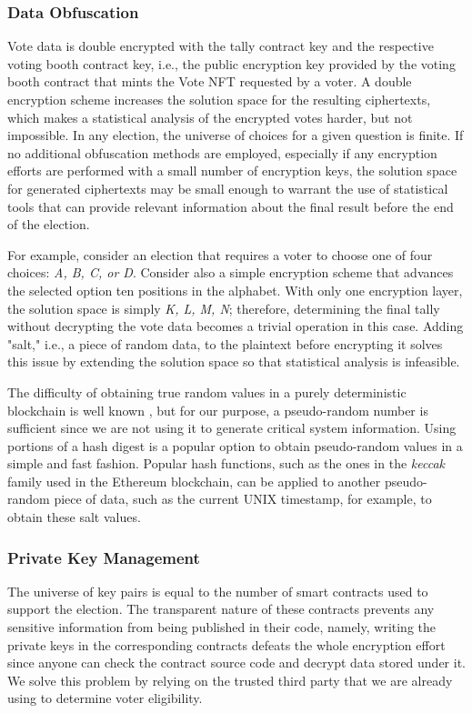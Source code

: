 \documentclass[../main.tex]{subfiles}
\begin{document}
\subsubsection{Data Obfuscation}
Vote data is double encrypted with the tally contract key and the respective voting booth contract key, i.e., the public encryption key provided by the voting booth contract that mints the Vote NFT requested by a voter. A double encryption scheme increases the solution space for the resulting ciphertexts, which makes a statistical analysis of the encrypted votes harder, but not impossible. In any election, the universe of choices for a given question is finite. If no additional obfuscation methods are employed, especially if any encryption efforts are performed with a small number of encryption keys, the solution space for generated ciphertexts may be small enough to warrant the use of statistical tools that can provide relevant information about the final result before the end of the election.
\par
For example, consider an election that requires a voter to choose one of four choices: \textit{A, B, C, or D}. Consider also a simple encryption scheme that advances the selected option ten positions in the alphabet. With only one encryption layer, the solution space is simply \textit{K, L, M, N}; therefore, determining the final tally without decrypting the vote data becomes a trivial operation in this case. Adding "salt," i.e., a piece of random data, to the plaintext before encrypting it solves this issue by extending the solution space so that statistical analysis is infeasible.
\par
The difficulty of obtaining true random values in a purely deterministic blockchain is well known \cite{Antonopoulos2018}, but for our purpose, a pseudo-random number is sufficient since we are not using it to generate critical system information. Using portions of a hash digest is a popular option to obtain pseudo-random values in a simple and fast fashion. Popular hash functions, such as the ones in the \textit{keccak} family used in the Ethereum blockchain, can be applied to another pseudo-random piece of data, such as the current UNIX timestamp, for example, to obtain these salt values.

\subsubsection{Private Key Management}
The universe of key pairs is equal to the number of smart contracts used to support the election. The transparent nature of these contracts prevents any sensitive information from being published in their code, namely, writing the private keys in the corresponding contracts defeats the whole encryption effort since anyone can check the contract source code and decrypt data stored under it. We solve this problem by relying on the trusted third party that we are already using to determine voter eligibility.
\end{document}

